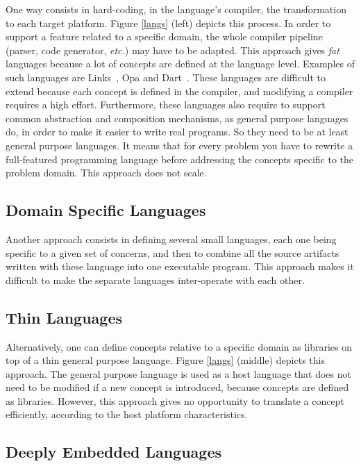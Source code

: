 \documentclass[preprint]{sigplanconf}
\newcommand{\etc}{\emph{etc.}}
\begin{document}
One way consists in hard-coding, in the language's compiler, the transformation to each target platform. Figure
\ref{langs} (left) depicts this process. In order to support a feature related to a specific domain, the whole
compiler pipeline (parser, code generator, \etc) may have to be adapted. This approach gives \emph{fat} languages
because a lot of concepts are defined at the language level. Examples of such languages are
Links~\cite{Cooper07_Links}, Opa and Dart~\cite{Griffith11_Dart}. These languages are difficult to extend because
each concept is defined in the compiler, and modifying a compiler requires a high effort. Furthermore, these
languages also require to support common abstraction and composition mechanisms, as general purpose languages do, in
order to make it easier to write real programs. So they need to be at least general purpose languages. It means that
for every problem you have to rewrite a full-featured programming language before addressing the concepts specific to
the problem domain. This approach does not scale.

\subsection{Domain Specific Languages}

Another approach consists in defining several small languages, each one being specific to a given set of concerns,
and then to combine all the source artifacts written with these language into one executable program. This approach
makes it difficult to make the separate languages inter-operate with each other.

\subsection{Thin Languages}

Alternatively, one can define concepts relative to a specific domain as libraries on top of a thin general purpose
language. Figure \ref{langs} (middle) depicts this approach. The general purpose language is used as a host language
that does not need to be modified if a new concept is introduced, because concepts are defined as libraries. However,
this approach gives no opportunity to translate a concept efficiently, according to the host platform
characteristics.

\subsection{Deeply Embedded Languages}
\end{document}
